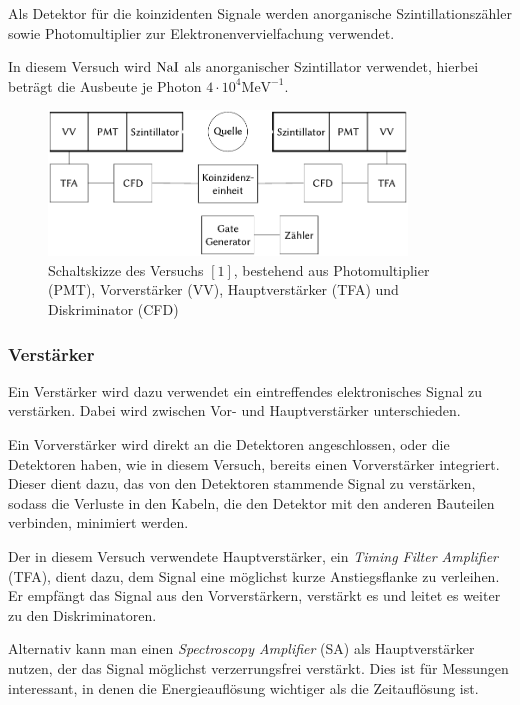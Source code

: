 \documentclass[12pt,a4paper]{scrartcl}
\numberwithin{equation}{section} %
\newcommand{\pu}[1]{\ensuremath{\mathrm{#1}}}
\begin{document}
Als Detektor für die koinzidenten Signale werden anorganische Szintillationszähler sowie Photomultiplier zur Elektronenvervielfachung verwendet.

In diesem Versuch wird $\ce{NaI}$ als anorganischer Szintillator verwendet, hierbei beträgt die Ausbeute je Photon $\pu{4\cdot 10^{4} MeV^{-1}}$.

\begin{figure}[h]
	\centering
	\includegraphics[width=0.85\textwidth]{../media/B3.4/Schaltplan.pdf}
	\caption{Schaltskizze des Versuchs $[1]$, bestehend aus
		Photomultiplier (PMT), Vorverstärker (VV),
		Hauptverstärker (TFA) und Diskriminator (CFD)}
	\label{abb:Schaltplan}
\end{figure}


\hypertarget{verstuxe4rker}{%
\subsubsection{Verstärker}\label{verstuxe4rker}}

Ein Verstärker wird dazu verwendet ein eintreffendes elektronisches Signal zu verstärken. Dabei wird zwischen Vor- und Hauptverstärker unterschieden.

Ein Vorverstärker wird direkt an die Detektoren angeschlossen, oder die Detektoren haben, wie in diesem Versuch, bereits einen Vorverstärker integriert. Dieser dient dazu, das von den Detektoren stammende Signal
zu verstärken, sodass die Verluste in den Kabeln, die den Detektor mit den anderen Bauteilen verbinden, minimiert werden.

Der in diesem Versuch verwendete Hauptverstärker, ein \emph{Timing Filter Amplifier} (TFA), dient dazu, dem Signal eine möglichst kurze Anstiegsflanke zu verleihen. Er empfängt das Signal aus den Vorverstärkern, verstärkt es und leitet es weiter zu den Diskriminatoren.

Alternativ kann man einen \emph{Spectroscopy Amplifier} (SA) als Hauptverstärker nutzen, der das Signal möglichst verzerrungsfrei verstärkt. Dies ist für Messungen interessant, in denen die Energieauflösung wichtiger als die Zeitauflösung ist.
\end{document}
